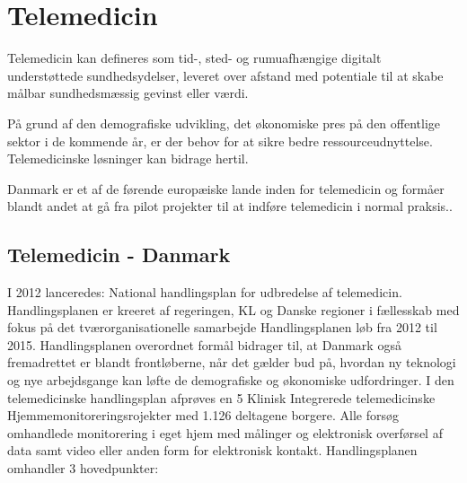 \section{Telemedicin}\label{telemedicin}
Telemedicin kan defineres som tid-, sted- og rumuafhængige digitalt understøttede sundhedsydelser, leveret over afstand med potentiale til at skabe målbar sundhedsmæssig gevinst eller værdi\cite{Regioner2012}.

På grund af den demografiske udvikling, det økonomiske pres på den offentlige sektor i de kommende år, er der behov for at sikre bedre ressourceudnyttelse. Telemedicinske løsninger kan bidrage hertil.\cite{Regioner2012}
 
Danmark er et af de førende europæiske lande inden for telemedicin og formåer blandt andet at gå fra pilot projekter til at indføre telemedicin i normal praksis.\cite{FabienneAbadieCristianoCodagnone2011}.
  

\subsection{Telemedicin - Danmark}

I 2012 lanceredes: \textquotedbl National handlingsplan for udbredelse af telemedicin\textquotedbl. Handlingsplanen er kreeret af regeringen, KL og Danske regioner i fællesskab med fokus på det tværorganisationelle samarbejde Handlingsplanen løb fra 2012 til 2015. 
Handlingsplanen overordnet formål bidrager til, at Danmark også fremadrettet er blandt frontløberne, når det gælder bud på, hvordan ny teknologi og nye arbejdsgange kan løfte de demografiske og økonomiske udfordringer.\cite{Regioner2012} 
I den telemedicinske handlingsplan afprøves en 5 Klinisk Integrerede telemedicinske Hjemmemonitoreringsrojekter med 1.126 deltagene borgere. Alle forsøg omhandlede monitorering i eget hjem med målinger og elektronisk overførsel af data samt video eller anden form for elektronisk kontakt. Handlingsplanen omhandler 3 hovedpunkter: \cite{Regeringen2012} 

